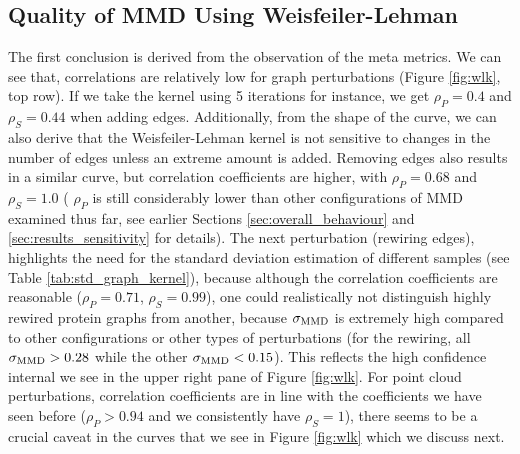 \subsection{Quality of MMD Using Weisfeiler-Lehman}\label{sec:quality_wl}
The first conclusion is
derived from the observation of the meta metrics. We can see that, correlations
are relatively low for graph perturbations (Figure \ref{fig:wlk}, top row). If
we take the kernel using 5 iterations for instance, we get $\rho_P=0.4$ and
$\rho_S=0.44$ when adding edges. Additionally, from the shape of the curve, we
can also derive that the Weisfeiler-Lehman kernel is not sensitive to changes in
the number of edges unless an extreme amount is added. Removing edges also
results in a similar curve, but correlation coefficients are higher, with
$\rho_P=0.68$ and $\rho_S=1.0$ ( $\rho_P$ is still considerably lower than other
configurations of MMD examined thus far, see earlier Sections
\ref{sec:overall_behaviour} and \ref{sec:results_sensitivity} for details). The
next perturbation (rewiring edges), highlights the need for the standard
deviation estimation of different samples (see Table
\ref{tab:std_graph_kernel}), because although the correlation coefficients are
reasonable ($\rho_P=0.71$, $\rho_S=0.99$), one could realistically not
distinguish highly rewired protein graphs from another, because $\sigma_{\text{MMD}}$ is
extremely high compared to other configurations or other types of perturbations
(for the rewiring, all $\sigma_{\text{MMD}}>0.28$ while the other $\sigma_{\text{MMD}}<0.15$).
This reflects the high confidence internal we see in the upper right pane of
Figure \ref{fig:wlk}. For point cloud perturbations, correlation coefficients
are in line with the coefficients we have seen before ($\rho_P>0.94$ and we
consistently have $\rho_S=1$), there seems to be a crucial caveat in the curves
that we see in Figure \ref{fig:wlk} which we discuss next.

